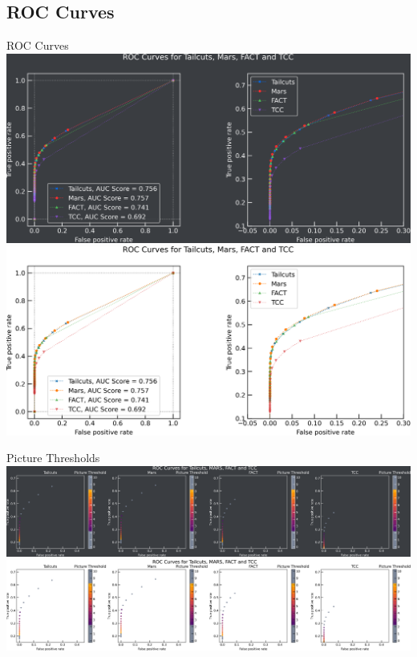 \subsection{ROC Curves}
\begin{frame}{ROC Curves}
  \ifdefined\darktheme
    \centering
    \includegraphics[width=\textwidth]{plots/roc_zoom_dark.png}
  \else
    \centering
    \includegraphics[width=\textwidth]{plots/roc_zoom_light.png}
  \fi
\end{frame}
\begin{frame}{Picture Thresholds}
  \ifdefined\darktheme
    \centering
    \includegraphics[width=\textwidth]{plots/pic_thresh_roc_dark.png}
  \else
    \centering
    \includegraphics[width=\textwidth]{plots/pic_thresh_roc_light.png}
  \fi
\end{frame}

